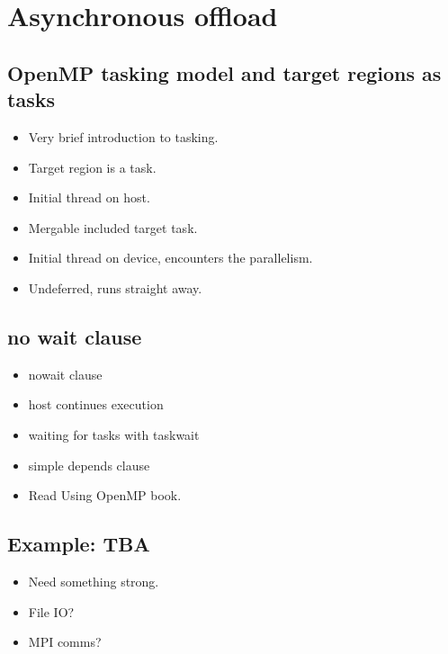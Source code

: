 
\def\ArtDir{06.Async/figures}


\chapter{Asynchronous offload}
\label{chapter:async}
\section{OpenMP tasking model and target regions as tasks}
\begin{itemize}
  \item Very brief introduction to tasking.
  \item Target region is a task.
  \item Initial thread on host.
  \item Mergable included target task.
  \item Initial thread on device, encounters the parallelism.
  \item Undeferred, runs straight away.
\end{itemize}

\section{no wait clause}
\begin{itemize}
  \item nowait clause
  \item host continues execution
  \item waiting for tasks with taskwait
  \item simple depends clause
  \item Read Using OpenMP book.
\end{itemize}

\section{Example: TBA}
\begin{itemize}
  \item Need something strong.
  \item File IO?
  \item MPI comms?
\end{itemize}

